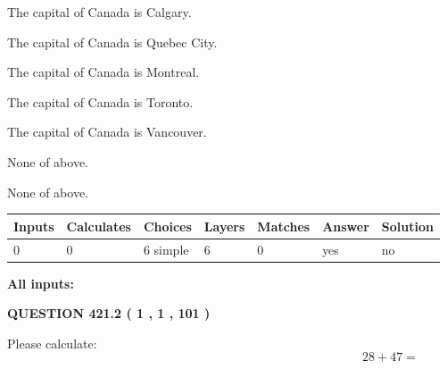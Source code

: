\documentclass[12pt]{article}
\begin{document}
 
The capital of Canada is Calgary.
 
 
The capital of Canada is Quebec City.
 
 
The capital of Canada is Montreal.
 
 
The capital of Canada is Toronto.
 
 
The capital of Canada is Vancouver.
 
 
 None of above.
 
 
\noindent{}
 
 
 None of above.
 
 
\noindent{}
 
 
   
   
   
   
\noindent\begin{tabular}{|l|l|l|l|l|l|l|}
 \hline
Inputs & Calculates & Choices & Layers & Matches & Answer & Solution \\ \hline
 0  & 
 0  & 
 6
  simple  
  & 
 6  & 
 0  & 
  yes & 
  no 
  \\ \hline
 \end{tabular}
   
   
   
   
\noindent{}
   
   
   
   
\noindent\vspace{0.1in}\hspace{-0.08in} {\textbf{\Large{All inputs: }}}
   
   
  
\vspace{0.2in}
  
{\textbf{\Large{QUESTION
421.2 
 ( 1 , 1 , 101 )
}}}
  
  
 
Please calculate:
\begin{equation}
28 +  %
47 = \nonumber
\end{equation}
 
 
 
\noindent{}
 
\end{document}
